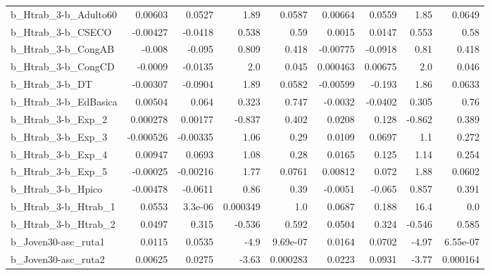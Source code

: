 \begin{tabular}{lrrrrrrrr}
b\_Htrab\_3-b\_Adulto60       &     0.00603 &       0.0527 &      1.89 &   0.0587 &    0.00664 &      0.0559 &         1.85 &        0.0649 \\
b\_Htrab\_3-b\_CSECO          &    -0.00427 &      -0.0418 &     0.538 &     0.59 &     0.0015 &      0.0147 &        0.553 &          0.58 \\
b\_Htrab\_3-b\_CongAB         &      -0.008 &       -0.095 &     0.809 &    0.418 &   -0.00775 &     -0.0918 &         0.81 &         0.418 \\
b\_Htrab\_3-b\_CongCD         &     -0.0009 &      -0.0135 &       2.0 &    0.045 &   0.000463 &     0.00675 &          2.0 &         0.046 \\
b\_Htrab\_3-b\_DT             &    -0.00307 &      -0.0904 &      1.89 &   0.0582 &   -0.00599 &      -0.193 &         1.86 &        0.0633 \\
b\_Htrab\_3-b\_EdBasica       &     0.00504 &        0.064 &     0.323 &    0.747 &    -0.0032 &     -0.0402 &        0.305 &          0.76 \\
b\_Htrab\_3-b\_Exp\_2          &    0.000278 &      0.00177 &    -0.837 &    0.402 &     0.0208 &       0.128 &       -0.862 &         0.389 \\
b\_Htrab\_3-b\_Exp\_3          &   -0.000526 &     -0.00335 &      1.06 &     0.29 &     0.0109 &      0.0697 &          1.1 &         0.272 \\
b\_Htrab\_3-b\_Exp\_4          &     0.00947 &       0.0693 &      1.08 &     0.28 &     0.0165 &       0.125 &         1.14 &         0.254 \\
b\_Htrab\_3-b\_Exp\_5          &    -0.00025 &     -0.00216 &      1.77 &   0.0761 &    0.00812 &       0.072 &         1.88 &        0.0602 \\
b\_Htrab\_3-b\_Hpico          &    -0.00478 &      -0.0611 &      0.86 &     0.39 &    -0.0051 &      -0.065 &        0.857 &         0.391 \\
b\_Htrab\_3-b\_Htrab\_1        &      0.0553 &      3.3e-06 &  0.000349 &      1.0 &     0.0687 &       0.188 &         16.4 &           0.0 \\
b\_Htrab\_3-b\_Htrab\_2        &      0.0497 &        0.315 &    -0.536 &    0.592 &     0.0504 &       0.324 &       -0.546 &         0.585 \\
b\_Joven30-asc\_ruta1        &      0.0115 &       0.0535 &      -4.9 & 9.69e-07 &     0.0164 &      0.0702 &        -4.97 &      6.55e-07 \\
b\_Joven30-asc\_ruta2        &     0.00625 &       0.0275 &     -3.63 & 0.000283 &     0.0223 &      0.0931 &        -3.77 &      0.000164 \\

\end{tabular}
